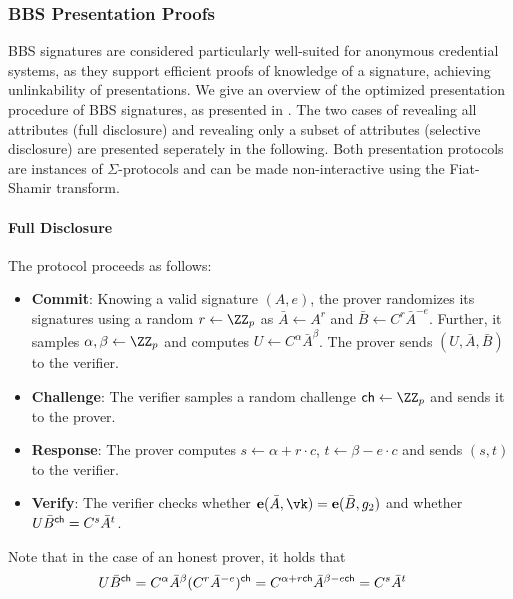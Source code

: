\subsubsection{BBS Presentation Proofs} \label{sec:prelims:bbs_pres}
BBS signatures are considered particularly well-suited for anonymous credential systems, as they support efficient proofs of knowledge of a signature, achieving unlinkability of presentations. We give an overview of the optimized presentation procedure of BBS signatures, as presented in \cite{DBLP:conf/eurocrypt/TessaroZ23a}. The two cases of revealing all attributes (full disclosure) and revealing only a subset of attributes (selective disclosure) are presented seperately in the following. Both presentation protocols are instances of $\Sigma$-protocols and can be made non-interactive using the Fiat-Shamir transform.

\paragraph{Full Disclosure}{
    The protocol proceeds as follows: 
    \begin{itemize}
        \item \textbf{Commit}: Knowing a valid signature $(A,e)$, the prover randomizes its signatures using a random $r\gets \ZZ_p$ as $\bar{A} \gets A^r$ and $\bar{B} \gets C^r \bar{A}^{-e}$. Further, it samples $\alpha,\beta\gets \ZZ_p$ and computes $U \gets C^{\alpha} \bar{A}^{\beta}$. The prover sends $(U,\bar{A},\bar{B})$ to the verifier.
        \item \textbf{Challenge}: The verifier samples a random challenge $\chall\gets \ZZ_p$ and sends it to the prover.
        \item \textbf{Response}: The prover computes $s\gets \alpha +r\cdot c$, $t\gets\beta-e\cdot c$ and sends $(s,t)$ to the verifier.
        \item \textbf{Verify}: The verifier checks whether $\pairing(\bar{A},\vk) = \pairing(\bar{B},g_2)$ and whether $U \bar{B}^{\mathsf{ch}} = C^s \bar{A}^t$.
    \end{itemize}
    Note that in the case of an honest prover, it holds that 
    \begin{align*}
        U \bar{B}^{\mathsf{ch}} 
        &= C^{\alpha} \bar{A}^{\beta} (C^r \bar{A}^{-e})^{\mathsf{ch}} 
        = C^{\alpha + r \mathsf{ch}} \bar{A}^{\beta - e \mathsf{ch}} 
        = C^s \bar{A}^t
    \end{align*}
}

